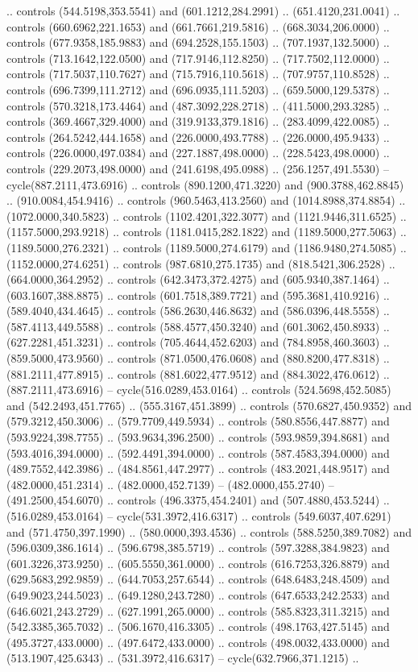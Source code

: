 .. controls (544.5198,353.5541) and (601.1212,284.2991) .. (651.4120,231.0041) .. controls (660.6962,221.1653) and (661.7661,219.5816) .. (668.3034,206.0000) .. controls (677.9358,185.9883) and (694.2528,155.1503) .. (707.1937,132.5000) .. controls (713.1642,122.0500) and (717.9146,112.8250) .. (717.7502,112.0000) .. controls (717.5037,110.7627) and (715.7916,110.5618) .. (707.9757,110.8528) .. controls (696.7399,111.2712) and (696.0935,111.5203) .. (659.5000,129.5378) .. controls (570.3218,173.4464) and (487.3092,228.2718) .. (411.5000,293.3285) .. controls (369.4667,329.4000) and (319.9133,379.1816) .. (283.4099,422.0085) .. controls (264.5242,444.1658) and (226.0000,493.7788) .. (226.0000,495.9433) .. controls (226.0000,497.0384) and (227.1887,498.0000) .. (228.5423,498.0000) .. controls (229.2073,498.0000) and (241.6198,495.0988) .. (256.1257,491.5530) -- cycle(887.2111,473.6916) .. controls (890.1200,471.3220) and (900.3788,462.8845) .. (910.0084,454.9416) .. controls (960.5463,413.2560) and (1014.8988,374.8854) .. (1072.0000,340.5823) .. controls (1102.4201,322.3077) and (1121.9446,311.6525) .. (1157.5000,293.9218) .. controls (1181.0415,282.1822) and (1189.5000,277.5063) .. (1189.5000,276.2321) .. controls (1189.5000,274.6179) and (1186.9480,274.5085) .. (1152.0000,274.6251) .. controls (987.6810,275.1735) and (818.5421,306.2528) .. (664.0000,364.2952) .. controls (642.3473,372.4275) and (605.9340,387.1464) .. (603.1607,388.8875) .. controls (601.7518,389.7721) and (595.3681,410.9216) .. (589.4040,434.4645) .. controls (586.2630,446.8632) and (586.0396,448.5558) .. (587.4113,449.5588) .. controls (588.4577,450.3240) and (601.3062,450.8933) .. (627.2281,451.3231) .. controls (705.4644,452.6203) and (784.8958,460.3603) .. (859.5000,473.9560) .. controls (871.0500,476.0608) and (880.8200,477.8318) .. (881.2111,477.8915) .. controls (881.6022,477.9512) and (884.3022,476.0612) .. (887.2111,473.6916) -- cycle(516.0289,453.0164) .. controls (524.5698,452.5085) and (542.2493,451.7765) .. (555.3167,451.3899) .. controls (570.6827,450.9352) and (579.3212,450.3006) .. (579.7709,449.5934) .. controls (580.8556,447.8877) and (593.9224,398.7755) .. (593.9634,396.2500) .. controls (593.9859,394.8681) and (593.4016,394.0000) .. (592.4491,394.0000) .. controls (587.4583,394.0000) and (489.7552,442.3986) .. (484.8561,447.2977) .. controls (483.2021,448.9517) and (482.0000,451.2314) .. (482.0000,452.7139) -- (482.0000,455.2740) -- (491.2500,454.6070) .. controls (496.3375,454.2401) and (507.4880,453.5244) .. (516.0289,453.0164) -- cycle(531.3972,416.6317) .. controls (549.6037,407.6291) and (571.4750,397.1990) .. (580.0000,393.4536) .. controls (588.5250,389.7082) and (596.0309,386.1614) .. (596.6798,385.5719) .. controls (597.3288,384.9823) and (601.3226,373.9250) .. (605.5550,361.0000) .. controls (616.7253,326.8879) and (629.5683,292.9859) .. (644.7053,257.6544) .. controls (648.6483,248.4509) and (649.9023,244.5023) .. (649.1280,243.7280) .. controls (647.6533,242.2533) and (646.6021,243.2729) .. (627.1991,265.0000) .. controls (585.8323,311.3215) and (542.3385,365.7032) .. (506.1670,416.3305) .. controls (498.1763,427.5145) and (495.3727,433.0000) .. (497.6472,433.0000) .. controls (498.0032,433.0000) and (513.1907,425.6343) .. (531.3972,416.6317) -- cycle(632.7966,371.1215) .. 